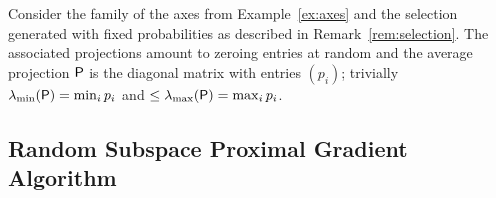 {
\begin{example}\label{ex:P}
Consider the family of the axes from Example~\ref{ex:axes} and the selection generated with fixed probabilities as described in Remark~\ref{rem:selection}. The associated projections amount to zeroing entries at random and the average projection ${\mathsf{P}}$ is the diagonal matrix with entries $(p_i)$; trivially $\lambda_{\min}({\mathsf{P}})= \min_i p_i$ and $\leq \lambda_{\max}({\mathsf{P}}) = \max_i p_i$.
\end{example}}

\subsection{Random Subspace Proximal Gradient Algorithm} \label{sec:mor-algo}


